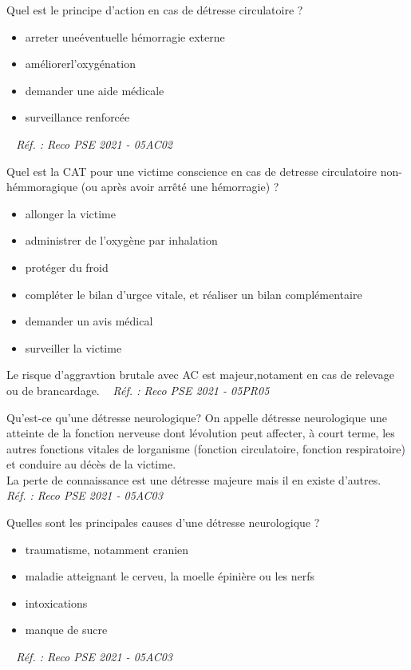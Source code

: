 \documentclass[grid,avery5371,landscape]{flashcards}
\makeatletter
\newcounter{nocarte}
\newcommand{\categ}[1]{%
  \def\@categ{#1}%
  \setcounter{nocarte}{0}%
}
\newcommand{\source}[1]{%
  \medskip
  \itshape%
   ~ \hfill Réf. : #1}
\makeatother
\begin{document}
\color[HTML]{003273}
\categ{PSE}
\begin{flashcard}[CAT]{
 Quel est le principe d'action en cas de détresse circulatoire ?   }
  \begin{itemize} \item arreter uneéventuelle hémorragie externe \item améliorerl'oxygénation \item demander une aide médicale \item surveillance renforcée \end{itemize}
  \source{Reco PSE 2021 - 05AC02}
\end{flashcard}


\color[HTML]{003273}
\categ{PSE}
\begin{flashcard}[CAT]{
 Quel est la CAT pour une victime conscience en cas de detresse circulatoire non-hémmoragique (ou après avoir arrêté une hémorragie) ?   }
  \begin{itemize} \item allonger la victime \item administrer de l'oxygène par inhalation \item protéger du froid \item compléter le bilan d'urgce vitale, et réaliser un bilan complémentaire \item demander un avis médical \item surveiller la victime \end{itemize} Le risque d'aggravtion brutale avec AC est majeur,notament en cas de relevage ou de brancardage.
  \source{Reco PSE 2021 - 05PR05}
\end{flashcard}


\color[HTML]{003273}
\categ{PSE}
\begin{flashcard}[bilan]{
 Qu'est-ce qu'une détresse neurologique?   }
  On appelle détresse neurologique une atteinte de la fonction nerveuse dont lévolution peut affecter, à court terme, les autres fonctions vitales de lorganisme (fonction circulatoire, fonction respiratoire) et conduire au décès de la victime. \\ 
La perte de connaissance est une détresse majeure mais il en existe d'autres.
  \source{Reco PSE 2021 - 05AC03}
\end{flashcard}


\color[HTML]{003273}
\categ{PSE}
\begin{flashcard}[bilan]{
 Quelles sont les principales causes d'une détresse neurologique ?   }
  \begin{itemize} \item traumatisme, notamment cranien \item maladie atteignant le cerveu, la moelle épinière ou les nerfs \item intoxications \item manque de sucre \end{itemize}
  \source{Reco PSE 2021 - 05AC03}
\end{flashcard}
\end{document}
